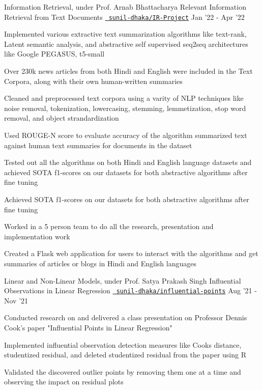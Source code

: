 
\begin{cventries}
  \cventry
  {Information Retrieval, under Prof. Arnab Bhattacharya}
  {Relevant Information Retrieval from Text Documents}
  {\texttt{\href{https://github.com/sunil-dhaka/IR-Project}{\faGithub{} sunil-dhaka/IR-Project}}}
  {Jan '22 - Apr '22}
  {
    \begin{cvitems}
    \item Implemented various extractive text summarization algorithms like text-rank, Latent semantic analysis, and abstractive self supervised seq2seq architectures like Google PEGASUS, t5-small
    \item Over 230k news articles from both Hindi and English were included in the Text Corpora, along with their own human-written summaries
    \item Cleaned and preprocessed text corpora using a varity of NLP techniques like noise removal, tokenization, lowercasing, stemming, lemmetization, stop word removal, and object strandardization
    \item Used ROUGE-N score to evaluate accuracy of the algorithm summarized text against human text summaries for documents in the dataset
    \item Tested out all the algorithms on both Hindi and English language datasets and achieved SOTA f1-scores on our datasets for both abstractive algorithms after fine tuning
    \item Achieved SOTA f1-scores on our datasets for both abstractive algorithms after fine tuning
    \item Worked in a 5 person team to do all the research, presentation and implementation work
    \item Created a Flask web application for users to interact with the algorithms and get summaries of articles or blogs in Hindi and English languages 
    \end{cvitems}
  }
  
  \cventry
  {Linear and Non-Linear Models, under Prof. Satya Prakash Singh}
  {Influential Observations in Linear Regression}
  {\texttt{\href{https://github.com/sunil-dhaka/influential-points-in-lr}{\faGithub{} sunil-dhaka/influential-points}}}
  {Aug '21 - Nov '21}
  {
    \begin{cvitems}
    \item Conducted research on and delivered a class presentation on Professor Dennis Cook's paper "Influential Points in Linear Regression" 
    \item Implemented influential observation detection measures like Cooks distance, studentized residual, and deleted studentized residual from the paper using R
    \item Validated the discovered outlier points by removing them one at a time and observing the impact on residual plots 
    \end{cvitems}
  }


\end{cventries}
